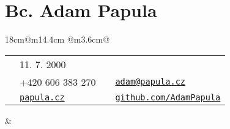 \documentclass[12pt,a4paper]{article}
\begin{document}
\begin{comment}
  \tableofcontents
\end{comment}
\pagestyle{empty}
\section[Adam Papula]{Bc. Adam Papula}
\noindent
\begin{tabularx}{18cm}{@{}m{14.4cm} @{}m{3.6cm}@{}}
  {
    \small{
      \begin{tabular}{lp{4cm}lp{8cm}}
        \faIcon{user}      & 11. 7. 2000                                    &   \faIcon{home}       & \\
        \faIcon{phone}     & +420 606 383 270                               &   \faIcon{envelope}   & \href{mailto:adam@papula.cz}{\texttt{adam@papula.cz}}\\
        \faIcon{globe}     & \href{http://papula.cz}{\texttt{papula.cz}}    &   \faIcon{github}     & \href{https://github.com/AdamPapula}{\texttt{github.com/AdamPapula}}     \\
      \end{tabular}
    }
  } &
  {
    \hfill
  }
\end{tabularx}
  
  
  
  
  
  
  
  
\end{document}
